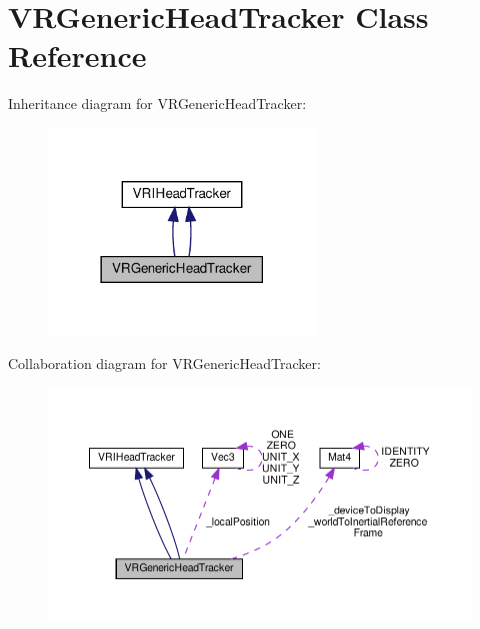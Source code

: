 \hypertarget{classVRGenericHeadTracker}{}\section{V\+R\+Generic\+Head\+Tracker Class Reference}
\label{classVRGenericHeadTracker}


Inheritance diagram for V\+R\+Generic\+Head\+Tracker\+:
\nopagebreak
\begin{figure}[H]
\begin{center}
\leavevmode
\includegraphics[width=201pt]{classVRGenericHeadTracker__inherit__graph}
\end{center}
\end{figure}


Collaboration diagram for V\+R\+Generic\+Head\+Tracker\+:
\nopagebreak
\begin{figure}[H]
\begin{center}
\leavevmode
\includegraphics[width=350pt]{classVRGenericHeadTracker__coll__graph}
\end{center}
\end{figure}
